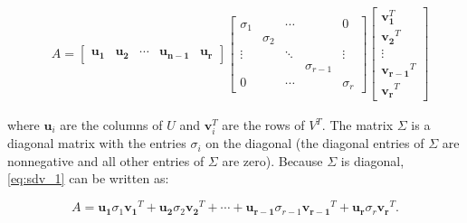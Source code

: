 \documentclass[10pt,addpoints]{exam} %
\begin{document}
\begin{questions}
\begin{equation}
  \begin{aligned}
    & A=\left[\begin{array}{lllll}
                \mathbf{u}_{\mathbf{1}} & \mathbf{u}_{\mathbf{2}} & \cdots & \mathbf{u}_{\mathbf{n}-\mathbf{1}} & \mathbf{u}_{\mathbf{r}}
              \end{array}\right]\left[\begin{array}{lllll}
                                        \sigma_1 & & \cdots& & 0\\
                                                 & \sigma_2 & & & \\
                                                 \vdots& & \ddots & & \vdots\\
                                                 & & & \sigma_{r-1} & \\
                                                 0& & \cdots& & \sigma_r
                                      \end{array}\right]\left[\begin{array}{c}
                                                                \mathbf{v}_{\mathbf{1}}^T \\
                                                                \mathbf{v}_{\mathbf{2}}{ }^T \\
                                                                \vdots \\
                                                                \mathbf{v}_{\mathbf{r-1}}{ }^T \\
                                                                \mathbf{v}_{\mathbf{r}}{ }^T
                                                              \end{array}\right]
  \end{aligned}
  \label{eq:sdv_1}
\end{equation}

where $\mathbf{u}_i$ are the columns of $U$ and $\mathbf{v}^T_i$ are the rows of $V^T$. The matrix
$\Sigma$ is a diagonal matrix with the entries $\sigma_i$ on the diagonal (the diagonal entries of
$\Sigma$ are nonnegative and all other entries of $\Sigma$ are zero). Because $\Sigma$ is diagonal,
\cref{eq:sdv_1} can be written as:

    \begin{equation}
      \label{eq:sumA}
      A=\mathbf{u}_{\mathbf{1}} \sigma_1 \mathbf{v}_{\mathbf{1}}{
      }^T+\mathbf{u}_{\mathbf{2}} \sigma_2 \mathbf{v}_{\mathbf{2}}{
      }^T+\cdots+\mathbf{u}_{\mathbf{r}-\mathbf{1}} \sigma_{r-1}
      \mathbf{v}_{\mathbf{r}-\mathbf{1}}{ }^T+\mathbf{u}_{\mathbf{r}} \sigma_r
      \mathbf{v}_{\mathbf{r}}{ }^T.
    \end{equation}
    

\end{questions}
\end{document}
